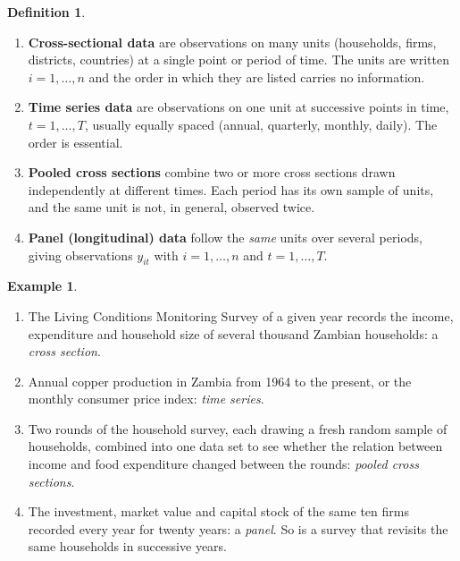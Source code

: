 \documentclass[11pt,a4paper]{article}
\numberwithin{equation}{section}
\theoremstyle{definition}
\newtheorem{defn}[thm]{Definition}
\newtheorem{exa}[thm]{Example}
\begin{document}
\begin{defn}
\label{def:data}
\begin{enumerate}[label=(\roman*)]
\item \textbf{Cross-sectional data} are observations on many units (households, firms, districts, countries) at a single point or period of
time. The units are written $i = 1, \dots, n$ and the order in which they are listed carries no information.
\item \textbf{Time series data} are observations on one unit at successive points in time, $t = 1, \dots, T$, usually equally spaced (annual,
quarterly, monthly, daily). The order is essential.
\item \textbf{Pooled cross sections} combine two or more cross sections drawn independently at different times. Each period has its own sample
of units, and the same unit is not, in general, observed twice.
\item \textbf{Panel (longitudinal) data} follow the \emph{same} units over several periods, giving observations $y_{it}$ with
$i = 1, \dots, n$ and $t = 1, \dots, T$.
\end{enumerate}
\end{defn}

\begin{exa}
\begin{enumerate}[label=(\roman*)]
\item The Living Conditions Monitoring Survey of a given year records the income, expenditure and household size of several thousand Zambian
households: a \emph{cross section}.
\item Annual copper production in Zambia from 1964 to the present, or the monthly consumer price index: \emph{time series}.
\item Two rounds of the household survey, each drawing a fresh random sample of households, combined into one data set to see whether the
relation between income and food expenditure changed between the rounds: \emph{pooled cross sections}.
\item The investment, market value and capital stock of the same ten firms recorded every year for twenty years: a \emph{panel}. So is a
survey that revisits the same households in successive years.
\end{enumerate}
\end{exa}
\end{document}

